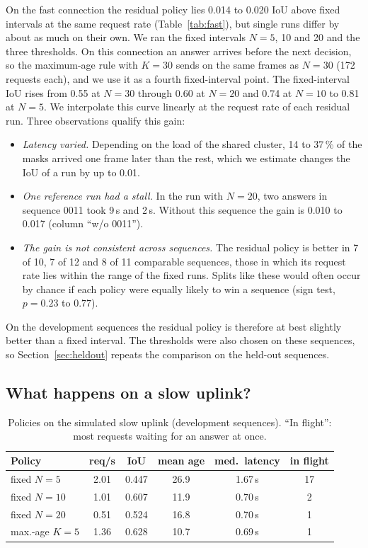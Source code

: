 \documentclass[conference]{IEEEtran}
\begin{document}
On the fast connection the residual policy lies 0.014 to 0.020 IoU above fixed intervals at the same request rate (Table~\ref{tab:fast}), but single runs differ by about as much on their own. We ran the fixed intervals $N=5$, 10 and 20 and the three thresholds. On this connection an answer arrives before the next decision, so the maximum-age rule with $K=30$ sends on the same frames as $N=30$ (172 requests each), and we use it as a fourth fixed-interval point. The fixed-interval IoU rises from 0.55 at $N=30$ through 0.60 at $N=20$ and 0.74 at $N=10$ to 0.81 at $N=5$. We interpolate this curve linearly at the request rate of each residual run. Three observations qualify this gain:
\begin{itemize}
\item \emph{Latency varied.} Depending on the load of the shared cluster, 14 to 37\,\% of the masks arrived one frame later than the rest, which we estimate changes the IoU of a run by up to 0.01.
\item \emph{One reference run had a stall.} In the run with $N=20$, two answers in sequence 0011 took 9\,s and 2\,s. Without this sequence the gain is 0.010 to 0.017 (column ``w/o 0011'').
\item \emph{The gain is not consistent across sequences.} The residual policy is better in 7 of 10, 7 of 12 and 8 of 11 comparable sequences, those in which its request rate lies within the range of the fixed runs. Splits like these would often occur by chance if each policy were equally likely to win a sequence (sign test, $p=0.23$ to $0.77$).
\end{itemize}
On the development sequences the residual policy is therefore at best slightly better than a fixed interval. The thresholds were also chosen on these sequences, so Section~\ref{sec:heldout} repeats the comparison on the held-out sequences.

\subsection{What happens on a slow uplink?}
\label{sec:slow}

\begin{table}[t]
\centering
\caption{Policies on the simulated slow uplink (development sequences). ``In flight'': most requests waiting for an answer at once.}
\label{tab:slow}
\footnotesize
\setlength{\tabcolsep}{3pt}
\begin{tabular}{lccccc}
\toprule
Policy & req/s & IoU & mean age & med.\ latency & in flight \\
\midrule
fixed $N=5$ & 2.01 & 0.447 & 26.9 & 1.67\,s & 17 \\
fixed $N=10$ & 1.01 & 0.607 & 11.9 & 0.70\,s & 2 \\
fixed $N=20$ & 0.51 & 0.524 & 16.8 & 0.70\,s & 1 \\
max.-age $K=5$ & 1.36 & 0.628 & 10.7 & 0.69\,s & 1 \\
\bottomrule
\end{tabular}
\end{table}
\end{document}
